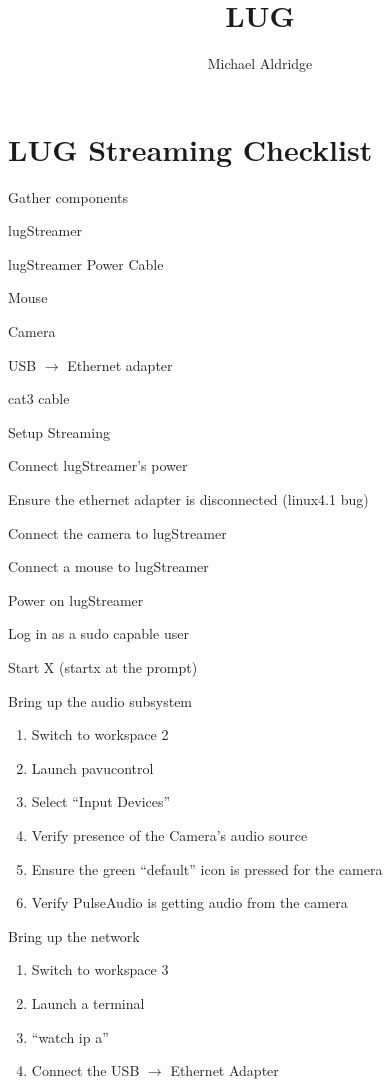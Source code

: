 \documentclass[12pt,letterpaper,oneside]{article}
\title{LUG}
\author{Michael Aldridge}
\newenvironment{checklist}{%
	\begin{list}{}{}%
	\let\olditem\item
	\renewcommand\item{\olditem[$\Box$] }
	}{%
	\end{list}
}
\begin{document}
\section*{LUG Streaming Checklist}
\begin{enumerate}
\item Gather components
  \begin{checklist}
  \item lugStreamer
  \item lugStreamer Power Cable
  \item Mouse
  \item Camera
  \item USB $\to$ Ethernet adapter
  \item cat3 cable
  \end{checklist}
\item Setup Streaming
  \begin{checklist}
  \item Connect lugStreamer's power
  \item Ensure the ethernet adapter is disconnected (linux4.1 bug)
  \item Connect the camera to lugStreamer
  \item Connect a mouse to lugStreamer
  \item Power on lugStreamer
  \item Log in as a sudo capable user
  \item Start X (startx at the prompt)
  \item Bring up the audio subsystem
    \begin{enumerate}
    \item Switch to workspace 2
    \item Launch pavucontrol
    \item Select ``Input Devices''
    \item Verify presence of the Camera's audio source
    \item Ensure the green ``default'' icon is pressed for the camera
    \item Verify PulseAudio is getting audio from the camera
    \end{enumerate}
  \item Bring up the network
    \begin{enumerate}
    \item Switch to workspace 3
    \item Launch a terminal
    \item ``watch ip a''
    \item Connect the USB $\to$ Ethernet Adapter

\end{enumerate}
\end{checklist}
\end{enumerate}
\end{document}
